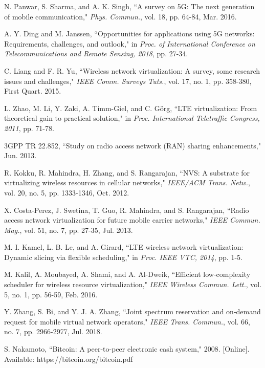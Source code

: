 \documentclass[journal]{IEEEtran}
\begin{document}
\begin{thebibliography}{1}	
 N. Panwar, S. Sharma, and A. K. Singh, ``A survey on 5G: The next generation of mobile communication," \emph{Phys. Commun.}, vol. 18, pp. 64-84, Mar. 2016.	

 A. Y. Ding and M. Janssen, ``Opportunities for applications using 5G networks: Requirements, challenges, and outlook," in \emph{Proc. of International Conference on Telecommunications and Remote Sensing, 2018}, pp. 27-34.
	
 C. Liang and F. R. Yu, ``Wireless network virtualization: A survey, some research issues and challenges," \emph{IEEE Comm. Surveys Tuts.}, vol. 17, no. 1, pp. 358-380, First Quart. 2015.

 L. Zhao, M. Li, Y. Zaki, A. Timm-Giel, and C. G\"org, ``LTE virtualization: From theoretical gain to practical solution," in \emph{Proc. International Teletraffic Congress, 2011}, pp. 71-78.

 3GPP TR 22.852, ``Study on radio access network (RAN) sharing enhancements," Jun. 2013.

 R. Kokku, R. Mahindra, H. Zhang, and S. Rangarajan, ``NVS: A substrate for virtualizing wireless resources in cellular networks," \emph{IEEE/ACM Trans. Netw.}, vol. 20, no. 5, pp. 1333-1346, Oct. 2012.

 X. Costa-Perez, J. Swetina, T. Guo, R. Mahindra, and S. Rangarajan, ``Radio access network virtualization for future mobile carrier networks," \emph{IEEE Commun. Mag.}, vol. 51, no. 7, pp. 27-35, Jul. 2013.

 M. I. Kamel, L. B. Le, and A. Girard, ``LTE wireless network virtualization: Dynamic slicing via flexible scheduling," in \emph{Proc. IEEE VTC, 2014}, pp. 1-5.

 M. Kalil, A. Moubayed, A. Shami, and A. Al-Dweik, ``Efficient low-complexity scheduler for wireless resource virtualization," \emph{IEEE Wireless Commun. Lett.}, vol. 5, no. 1, pp. 56-59, Feb. 2016.
	
 Y. Zhang, S. Bi, and Y. J. A. Zhang, ``Joint spectrum reservation and on-demand request for mobile virtual network operators," \emph{IEEE Trans. Commun.}, vol. 66, no. 7, pp. 2966-2977, Jul. 2018.
 
 S. Nakamoto, ``Bitcoin: A peer-to-peer electronic cash system," 2008. [Online]. Available: https://bitcoin.org/bitcoin.pdf
    

\end{thebibliography}
\end{document}
